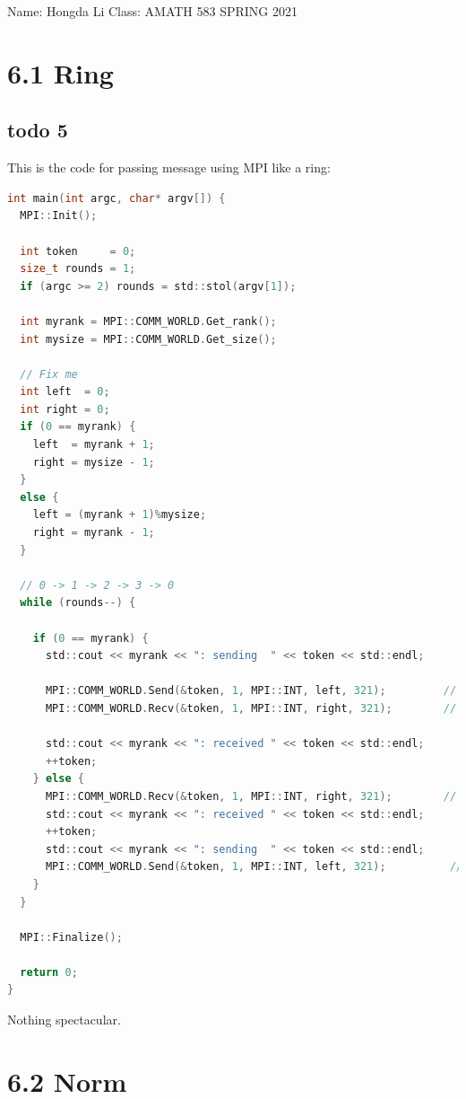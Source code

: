 \documentclass[]{article}
\begin{document}
\begin{center}
    Name: Hongda Li \quad Class: AMATH 583 \quad SPRING 2021 
\end{center}
\section*{6.1 Ring}
    \subsection*{todo 5}
        This is the code for passing message using MPI like a ring: 
        \begin{lstlisting}[language=c]
int main(int argc, char* argv[]) {
  MPI::Init();

  int token     = 0;
  size_t rounds = 1;
  if (argc >= 2) rounds = std::stol(argv[1]);

  int myrank = MPI::COMM_WORLD.Get_rank();
  int mysize = MPI::COMM_WORLD.Get_size();

  // Fix me
  int left  = 0;
  int right = 0;
  if (0 == myrank) {
    left  = myrank + 1;
    right = mysize - 1;
  }
  else {
    left = (myrank + 1)%mysize;
    right = myrank - 1; 
  }

  // 0 -> 1 -> 2 -> 3 -> 0
  while (rounds--) {

    if (0 == myrank) {
      std::cout << myrank << ": sending  " << token << std::endl;

      MPI::COMM_WORLD.Send(&token, 1, MPI::INT, left, 321);         // myrank -> myrank + 1, send to rank: 1
      MPI::COMM_WORLD.Recv(&token, 1, MPI::INT, right, 321);        // Receive from: rank - 1

      std::cout << myrank << ": received " << token << std::endl;
      ++token;
    } else {
      MPI::COMM_WORLD.Recv(&token, 1, MPI::INT, right, 321);        // receive from: rank - 1
      std::cout << myrank << ": received " << token << std::endl;
      ++token;
      std::cout << myrank << ": sending  " << token << std::endl;   
      MPI::COMM_WORLD.Send(&token, 1, MPI::INT, left, 321);          // myrank -> myrank + 1   (2 -> 3) send to: rank + 1
    }
  }

  MPI::Finalize();

  return 0;
}
        \end{lstlisting}
        Nothing spectacular. 


\section*{6.2 Norm}
\end{document}
